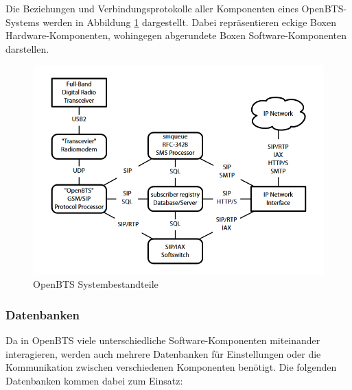 Die Beziehungen und Verbindungsprotokolle aller Komponenten eines OpenBTS-Systems werden in Abbildung \ref{fig:openbts} dargestellt. Dabei repräsentieren eckige Boxen Hardware-Komponenten, wohingegen abgerundete Boxen Software-Komponenten darstellen.

\begin{figure}[htbp]
	\centering
		\includegraphics[width=1.00\textwidth]{includes/openbts}
	\caption{OpenBTS Systembestandteile}
	\label{fig:openbts}
\end{figure}

\newpage

\subsubsection{Datenbanken}
Da in OpenBTS viele unterschiedliche Software-Komponenten miteinander interagieren, werden auch mehrere Datenbanken für Einstellungen oder die Kommunikation zwischen verschiedenen Komponenten benötigt. Die folgenden Datenbanken kommen dabei zum Einsatz:

